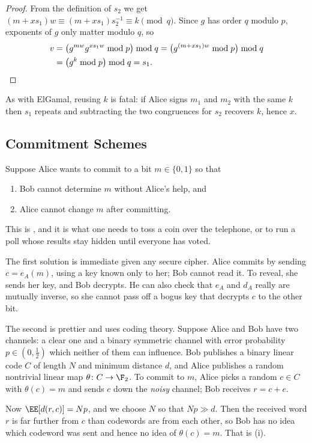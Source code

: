 \begin{proof}
	From the definition of $s_2$ we get $(m+xs_1)w \equiv (m+xs_1)s_2^{-1}\equiv k \pmod q$. Since $g$ has order $q$ modulo $p$, exponents of $g$ only matter modulo $q$, so
	\begin{align*}
		v &= \bigl(g^{mw}g^{xs_1w}\bmod p\bigr)\bmod q = \bigl(g^{(m+xs_1)w}\bmod p\bigr)\bmod q\\
		&= \bigl(g^k\bmod p\bigr)\bmod q = s_1. \qedhere
	\end{align*}
\end{proof}

As with ElGamal, reusing $k$ is fatal: if Alice signs $m_1$ and $m_2$ with the same $k$ then $s_1$ repeats and subtracting the two congruences for $s_2$ recovers $k$, hence $x$.

\subsection{Commitment Schemes}

Suppose Alice wants to commit to a bit $m \in\{0,1\}$ so that
\begin{enumerate}[label=(\roman*)]
	\item Bob cannot determine $m$ without Alice's help, and
	\item Alice cannot change $m$ after committing.
\end{enumerate}
This is , and it is what one needs to toss a coin over the telephone, or to run a poll whose results stay hidden until everyone has voted.

The first solution is immediate given any secure cipher. Alice commits by sending $c = e_A(m)$, using a key known only to her; Bob cannot read it. To reveal, she sends her key, and Bob decrypts. He can also check that $e_A$ and $d_A$ really are mutually inverse, so she cannot pass off a bogus key that decrypts $c$ to the other bit.

The second is prettier and uses coding theory. Suppose Alice and Bob have two channels: a clear one and a binary symmetric channel with error probability $p \in (0,\tfrac12)$ which neither of them can influence. Bob publishes a binary linear code $C$ of length $N$ and minimum distance $d$, and Alice publishes a random nontrivial linear map $\theta\colon C\to\F_2$. To commit to $m$, Alice picks a random $c \in C$ with $\theta(c)=m$ and sends $c$ down the \emph{noisy} channel; Bob receives $r = c+e$.

Now $\EE[d(r,c)] = Np$, and we choose $N$ so that $Np \gg d$. Then the received word $r$ is far further from $c$ than codewords are from each other, so Bob has no idea which codeword was sent and hence no idea of $\theta(c) = m$. That is (i).

